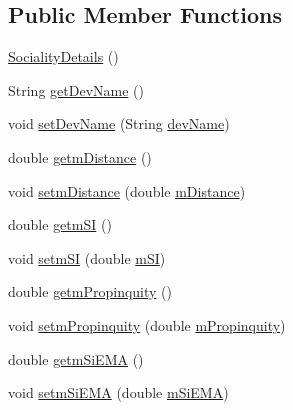 \subsection*{Public Member Functions}
\begin{DoxyCompactItemize}
\item 
\hyperlink{classcs_1_1usense_1_1inference_module_1_1_sociality_details_a7df8f3e338de5ddcad39fb342c9a0d95}{Sociality\+Details} ()
\item 
String \hyperlink{classcs_1_1usense_1_1inference_module_1_1_sociality_details_aa44a822677f84da0f862deb4f9b4e242}{get\+Dev\+Name} ()
\item 
void \hyperlink{classcs_1_1usense_1_1inference_module_1_1_sociality_details_a45e7637a6b67630c5a01a14e906268d6}{set\+Dev\+Name} (String \hyperlink{classcs_1_1usense_1_1inference_module_1_1_sociality_details_ae31fcda774a26e9eaa301d1c849c862e}{dev\+Name})
\item 
double \hyperlink{classcs_1_1usense_1_1inference_module_1_1_sociality_details_ab0b3d2c6248b9f6d0a318e384bb68b18}{getm\+Distance} ()
\item 
void \hyperlink{classcs_1_1usense_1_1inference_module_1_1_sociality_details_aa97d3de4535c615f3cde06d22c0c219c}{setm\+Distance} (double \hyperlink{classcs_1_1usense_1_1inference_module_1_1_sociality_details_a8fc3a7f6a0a00f2023f9587cdbe1d109}{m\+Distance})
\item 
double \hyperlink{classcs_1_1usense_1_1inference_module_1_1_sociality_details_a2b74b49f554362f219cf0c1f0152fcca}{getm\+S\+I} ()
\item 
void \hyperlink{classcs_1_1usense_1_1inference_module_1_1_sociality_details_a4506fba7e21a36087fd6a63197342114}{setm\+S\+I} (double \hyperlink{classcs_1_1usense_1_1inference_module_1_1_sociality_details_a6fe385a5a4ec1863bc015a2e7a519289}{m\+S\+I})
\item 
double \hyperlink{classcs_1_1usense_1_1inference_module_1_1_sociality_details_a472d7a3f6fc9f92ad1344bed388afbc4}{getm\+Propinquity} ()
\item 
void \hyperlink{classcs_1_1usense_1_1inference_module_1_1_sociality_details_a6f0741e2010ecf0f6e2d68da8e76e191}{setm\+Propinquity} (double \hyperlink{classcs_1_1usense_1_1inference_module_1_1_sociality_details_af5fa1a890198a03f5618b1df1d8747c4}{m\+Propinquity})
\item 
double \hyperlink{classcs_1_1usense_1_1inference_module_1_1_sociality_details_aa41c8d6cc028bd3376a56accd913f1dd}{getm\+Si\+E\+M\+A} ()
\item 
void \hyperlink{classcs_1_1usense_1_1inference_module_1_1_sociality_details_a53bb856318906c06a961803c65b31e12}{setm\+Si\+E\+M\+A} (double \hyperlink{classcs_1_1usense_1_1inference_module_1_1_sociality_details_a8752c40343750b4386076a200accfb45}{m\+Si\+E\+M\+A})

\end{DoxyCompactItemize}

